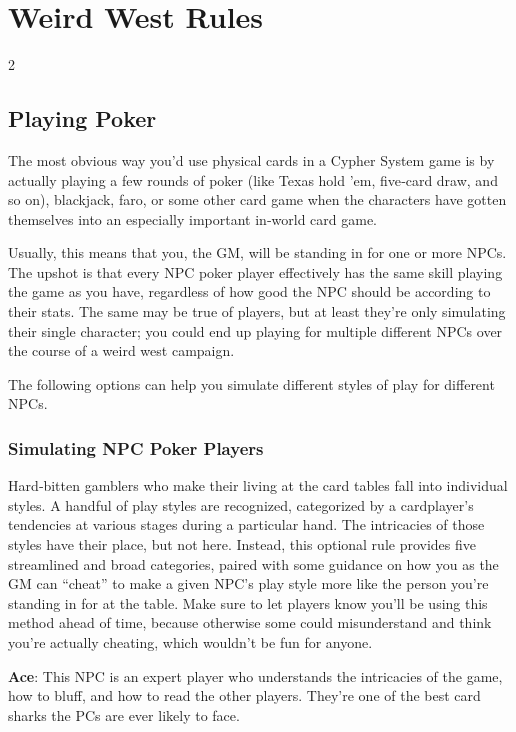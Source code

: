 \part{Weird West Rules}

\begin{multicols}{2}

\chapter{Playing Poker}
The most obvious way you’d use physical cards in a Cypher System game is by actually playing a few rounds of poker (like Texas hold ’em, five‑card draw, and so on), blackjack, faro, or some other card game when the characters have gotten themselves into an especially important in‑world card game. 

Usually, this means that you, the GM, will be standing in for one or more NPCs. The upshot is that every NPC poker player effectively has the same skill playing the game as you have, regardless of how good the NPC should be according to their stats. The same may be true of players, but at least they’re only simulating their single character; you could end up playing for multiple different NPCs over the course of a weird west campaign. 

The following options can help you simulate different styles of play for different NPCs.

\section{Simulating NPC Poker Players}
 
Hard‑bitten gamblers who make their living at the card tables fall into individual styles. A handful of play styles are recognized, categorized by a cardplayer’s tendencies at various stages during a particular hand. The intricacies of those styles have their place, but not here. Instead, this optional rule provides five streamlined and broad categories, paired with some guidance on how you as the GM can “cheat” to make a given NPC’s play style more like the person you’re standing in for at the table. Make sure to let players know you’ll be using this method ahead of time, because otherwise some could misunderstand and think you’re actually cheating, which wouldn’t be fun for anyone.

\textbf{Ace}: This NPC is an expert player who understands the intricacies of the game, how to bluff, and how to read the other players. They’re one of the best card sharks the PCs are ever likely to face. 


\end{multicols}
